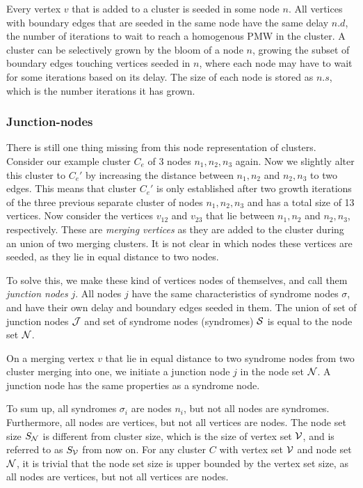 \begin{lemma}
  Every vertex $v$ that is added to a cluster is seeded in some node $n$. All vertices with boundary edges that are seeded in the same node have the same delay $n.d$, the number of iterations to wait to reach a homogenous PMW in the cluster. A cluster can be selectively grown by the bloom of a node $n$, growing the subset of boundary edges touching vertices seeded in $n$, where each node may have to wait for some iterations based on its delay. The size of each node is stored as $n.s$, which is the number iterations it has grown.
\end{lemma}

\subsubsection{Junction-nodes}

There is still one thing missing from this node representation of clusters. Consider our example cluster $C_e$ of 3 nodes $n_1, n_2, n_3$ again. Now we slightly alter this cluster to $C_e'$ by increasing the distance between $n_1, n_2$ and $n_2, n_3$ to two edges. This means that cluster $C_e'$ is only established after two growth iterations of the three previous separate cluster of nodes $n_1, n_2, n_3$ and has a total size of 13 vertices. Now consider the vertices $v_{12}$ and $v_{23}$ that lie between $n_1, n_2$ and $n_2, n_3$, respectively. These are \emph{merging vertices} as they are added to the cluster during an union of two merging clusters. It is not clear in which nodes these vertices are seeded, as they lie in equal distance to two nodes.

To solve this, we make these kind of vertices nodes of themselves, and call them \emph{junction nodes} $j$. All nodes $j$ have the same characteristics of syndrome nodes $\sigma$, and have their own delay and boundary edges seeded in them. The union of set of junction nodes $\mathcal{J}$ and set of syndrome nodes (syndromes) $\mathcal{S}$ is equal to the node set $\mathcal{N}$.

\begin{lemma}\label{lem:junctionode}
  On a merging vertex $v$ that lie in equal distance to two syndrome nodes from two cluster merging into one, we initiate a junction node $j$ in the node set $\mathcal{N}$. A junction node has the same properties as a syndrome node. 
\end{lemma}

To sum up, all syndromes $\sigma_i$ are nodes $n_i$, but not all nodes are syndromes. Furthermore, all nodes are vertices, but not all vertices are nodes. The node set size $S_{\mathcal{N}}$ is different from cluster size, which is the size of vertex set $\mathcal{V}$, and is referred to as $S_{\mathcal{V}}$ from now on. For any cluster $C$ with vertex set $\mathcal{V}$ and node set $\mathcal{N}$, it is trivial that the node set size is upper bounded by the vertex set size, as all nodes are vertices, but not all vertices are nodes.

